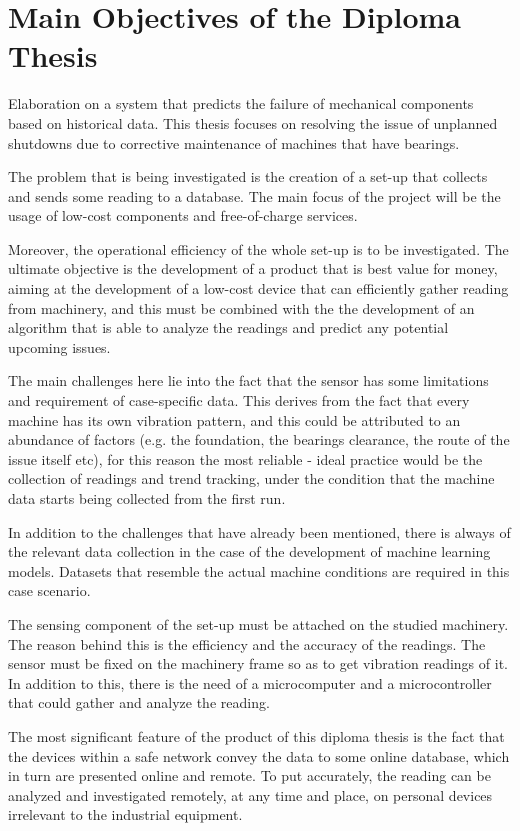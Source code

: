 \section{Main Objectives of the Diploma Thesis}
{	
Elaboration on a system that predicts the failure of mechanical components based on historical data. This thesis focuses on resolving the issue of unplanned shutdowns due to corrective maintenance of machines that have bearings.

The problem that is being investigated is the creation of a set-up that collects and sends some reading to a database. The main focus of the project will be the usage of low-cost components and free-of-charge services. 

Moreover, the operational efficiency of the whole set-up is to be investigated. The ultimate objective is the development of a product that is best value for money, aiming at the development of a low-cost device that can efficiently gather reading from machinery, and this must be combined with the the development of an algorithm that is able to analyze the readings and predict any potential upcoming issues.

The main challenges here lie into the fact that the sensor has some limitations and requirement of case-specific data. This derives from the fact that every machine has its own vibration pattern, and this could be attributed to an abundance of factors (e.g. the foundation, the bearings clearance, the route of the issue itself etc), for this reason the most reliable - ideal practice would be the collection of readings and trend tracking, under the condition that the machine data starts being collected from the first run. 

In addition to the challenges that have already been mentioned, there is always of the relevant data collection in the case of the development of machine learning models. Datasets that resemble the actual machine conditions are required in this case scenario.

The sensing component of the set-up must be attached on the studied machinery. The reason behind this is the efficiency and the accuracy of the readings. The sensor must be fixed on the machinery frame so as to get vibration readings of it. In addition to this, there is the need of a microcomputer and a microcontroller that could gather and analyze the reading.

The most significant feature of the product of this diploma thesis is the fact that the devices within a safe network convey the data to some online database, which in turn are presented online and remote. To put accurately, the reading can be analyzed and investigated remotely, at any time and place, on personal devices irrelevant to the industrial equipment.
}


